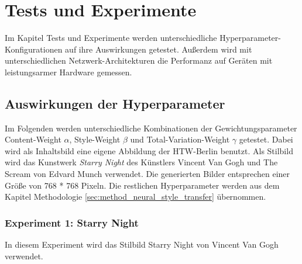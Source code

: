 \chapter{Tests und Experimente}
\label{cha:tests}

Im Kapitel Tests und Experimente werden unterschiedliche Hyperparameter-Konfigurationen auf ihre Auswirkungen getestet. Außerdem wird mit unterschiedlichen
Netzwerk-Architekturen die Performanz auf Geräten mit leistungsarmer Hardware gemessen.

\section{Auswirkungen der Hyperparameter}

Im Folgenden werden unterschiedliche Kombinationen der Gewichtungsparameter Content-Weight $ \alpha $, Style-Weight $ \beta $ und Total-Variation-Weight $ \gamma $ getestet. Dabei wird als Inhaltsbild  eine eigene Abbildung der HTW-Berlin benutzt. Als Stilbild wird das Kunstwerk \textit{Starry Night} des Künstlers Vincent Van Gogh und The Scream von Edvard Munch verwendet. Die generierten Bilder entsprechen einer Größe von 768 * 768 Pixeln. Die restlichen Hyperparameter werden aus dem Kapitel Methodologie \ref{sec:method_neural_style_transfer} übernommen.

\pagebreak

\subsection{Experiment 1: Starry Night}

In diesem Experiment wird das Stilbild Starry Night von Vincent Van Gogh verwendet.

